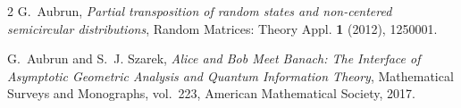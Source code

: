\documentclass[11pt,reqno]{amsart}
\begin{document}
\appendix


\begin{thebibliography}{2}
G.~Aubrun,
\emph{Partial transposition of random states and non-centered semicircular
distributions},
Random Matrices: Theory Appl. \textbf{1} (2012), 1250001.

G.~Aubrun and S.~J. Szarek,
\emph{Alice and Bob Meet Banach: The Interface of Asymptotic Geometric
Analysis and Quantum Information Theory},
Mathematical Surveys and Monographs, vol.~223, American Mathematical
Society, 2017.
\end{thebibliography}
\end{document}

